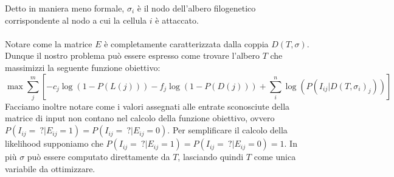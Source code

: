 \documentclass[12pt]{report}
\begin{document}
  Detto in maniera meno formale, ${\sigma}_{i}$ è il nodo dell'albero filogenetico corrispondente al nodo a cui la cellula $i$ è attaccato.\\\\
  Notare come la matrice $E$ è completamente caratterizzata dalla coppia $D(T, \sigma)$.
  Dunque il nostro problema può essere espresso come trovare l'albero $T$ che massimizzi la seguente funzione obiettivo:
  \[
    \max{\sum_{j}^{m}[-c_{j}\log(1-P(L(j)))-f_{j}\log(1-P(D(j)))+\sum_{i}^{n}\log(P(I_{ij}|D(T, \sigma_{i})_{j}))]}
  \]
  Facciamo inoltre notare come i valori assegnati alle entrate sconosciute della matrice di input non contano nel calcolo della funzione obiettivo, ovvero $P(I_{ij}=\ ?|E_{ij}=1)=P(I_{ij}=\ ?|E_{ij}=0)$. Per semplificare il calcolo della likelihood supponiamo che $P(I_{ij}=\ ?|E_{ij}=1)=P(I_{ij}=\ ?|E_{ij}=0)=1$.
  In più $\sigma$ può essere computato direttamente da $T$, lasciando quindi $T$ come unica variabile da ottimizzare.
\end{document}
